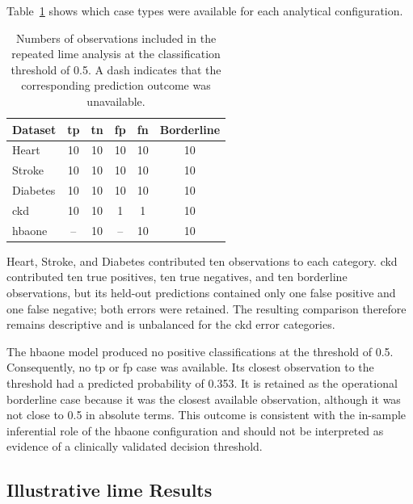 Table~\ref{tab:local_case_availability} shows which case types were available for each analytical configuration.

\begin{table}[htbp]
    \centering
    \small
    \renewcommand{\arraystretch}{1.15}
    \caption{Numbers of observations included in the repeated \gls{lime} analysis at the classification threshold of 0.5. A dash indicates that the corresponding prediction outcome was unavailable.}
    \label{tab:local_case_availability}
    \begin{tabular}{@{}lccccc@{}}
        \toprule
        \textbf{Dataset} & \textbf{\gls{tp}} & \textbf{\gls{tn}} & \textbf{\gls{fp}} & \textbf{\gls{fn}} & \textbf{Borderline} \\
        \midrule
        Heart & 10 & 10 & 10 & 10 & 10 \\
        Stroke & 10 & 10 & 10 & 10 & 10 \\
        Diabetes & 10 & 10 & 10 & 10 & 10 \\
        \gls{ckd} & 10 & 10 & 1 & 1 & 10 \\
        \gls{hbaone} & -- & 10 & -- & 10 & 10 \\
        \bottomrule
    \end{tabular}
\end{table}





Heart, Stroke, and Diabetes contributed ten observations to each category. \gls{ckd} contributed ten true positives, ten true negatives, and ten borderline observations, but its held-out predictions contained only one false positive and one false negative; both errors were retained. The resulting comparison therefore remains descriptive and is unbalanced for the \gls{ckd} error categories.

The \gls{hbaone} model produced no positive classifications at the threshold of 0.5. Consequently, no \gls{tp} or \gls{fp} case was available. Its closest observation to the threshold had a predicted probability of 0.353. It is retained as the operational borderline case because it was the closest available observation, although it was not close to 0.5 in absolute terms. This outcome is consistent with the in-sample inferential role of the \gls{hbaone} configuration and should not be interpreted as evidence of a clinically validated decision threshold.

\subsection{Illustrative \gls{lime} Results}

